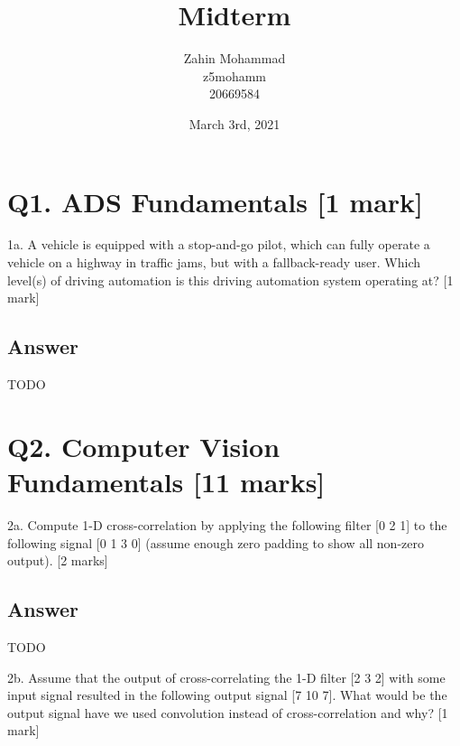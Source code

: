 \documentclass[
	12pt, %
]{fphw}
\title{Midterm} %
\author{Zahin Mohammad \\ z5mohamm \\ 20669584} %
\date{March 3rd, 2021} %
\institute{University of Waterloo} %
\begin{document}
\maketitle %
\section*{Q1. ADS Fundamentals [1 mark]}
\begin{problem}
1a. A vehicle is equipped with a stop-and-go pilot, which can fully operate a vehicle on a
highway in traffic jams, but with a fallback-ready user. Which level(s) of driving
automation is this driving automation system operating at? [1 mark]
\end{problem}
\subsection*{Answer}
TODO
\section*{Q2. Computer Vision Fundamentals [11 marks]}
\begin{problem}
2a. Compute 1-D cross-correlation by applying the following filter [0 2 1] to the
following signal [0 1 3 0] (assume enough zero padding to show all non-zero output). [2
		marks]
\end{problem}
\subsection*{Answer}
TODO
\begin{problem}
2b. Assume that the output of cross-correlating the 1-D filter [2 3 2] with some input
signal resulted in the following output signal [7 10 7]. What would be the output signal
have we used convolution instead of cross-correlation and why? [1 mark]
\end{problem}
\end{document}
